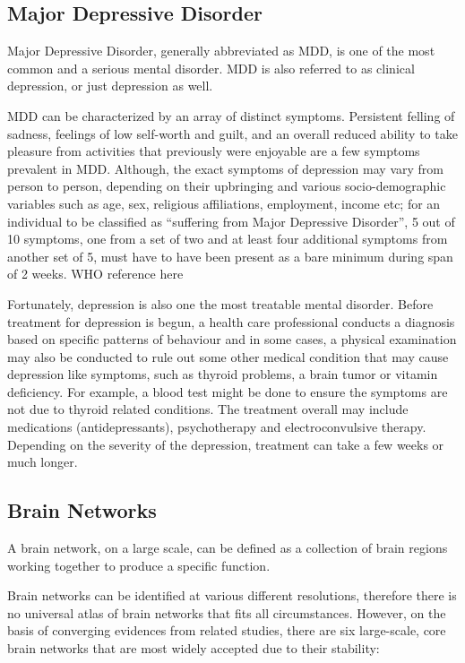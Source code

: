 \documentclass{article}
\begin{document}
\subsection{Major Depressive Disorder}

Major Depressive Disorder, generally abbreviated as MDD, is one of the
most common and a serious mental disorder. MDD is also referred to as
clinical depression, or just depression as well.

MDD can be characterized by an array of distinct symptoms. Persistent
felling of sadness, feelings of low self-worth and guilt, and an
overall reduced ability to take pleasure from activities that
previously were enjoyable are a few symptoms prevalent in MDD.
Although, the exact symptoms of depression may vary from person to
person, depending on their upbringing and various socio-demographic
variables such as age, sex, religious affiliations, employment, income
etc; for an individual to be classified as ``suffering from Major
Depressive Disorder'', 5 out of 10 symptoms, one from a set of two and
at least four additional symptoms from another set of 5, must have to
have been present as a bare minimum during span of 2 weeks.  %
WHO reference here

Fortunately, depression is also one the most treatable mental
disorder. Before treatment for depression is begun, a health care
professional conducts a diagnosis based on specific patterns of
behaviour and in some cases, a physical examination may also be
conducted to rule out some other medical condition that may cause
depression like symptoms, such as thyroid problems, a brain tumor or
vitamin deficiency. For example, a blood test might be done to ensure
the symptoms are not due to thyroid related conditions. The treatment
overall may include medications (antidepressants), psychotherapy and
electroconvulsive therapy. Depending on the severity of the
depression, treatment can take a few weeks or much longer.

\subsection{Brain Networks}

A brain network, on a large scale, can be defined as a collection of
brain regions working together to produce a specific function.

Brain networks can be identified at various different resolutions,
therefore there is no universal atlas of brain networks that fits all
circumstances. However, on the basis of converging evidences from
related studies, there are six large-scale, core brain networks that
are most widely accepted due to their stability:
\end{document}
